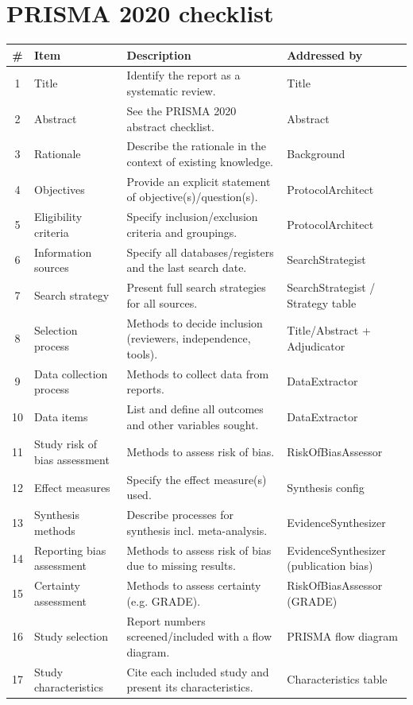 \documentclass[11pt]{article}
\begin{document}
\section{PRISMA 2020 checklist}
\begin{longtable}{c p{3.2cm} p{6.0cm} p{3.2cm}}
\toprule
\# & Item & Description & Addressed by \\
\midrule
\endhead
1 & Title & Identify the report as a systematic review. & Title \\
2 & Abstract & See the PRISMA 2020 abstract checklist. & Abstract \\
3 & Rationale & Describe the rationale in the context of existing knowledge. & Background \\
4 & Objectives & Provide an explicit statement of objective(s)/question(s). & ProtocolArchitect \\
5 & Eligibility criteria & Specify inclusion/exclusion criteria and groupings. & ProtocolArchitect \\
6 & Information sources & Specify all databases/registers and the last search date. & SearchStrategist \\
7 & Search strategy & Present full search strategies for all sources. & SearchStrategist / Strategy table \\
8 & Selection process & Methods to decide inclusion (reviewers, independence, tools). & Title/Abstract + Adjudicator \\
9 & Data collection process & Methods to collect data from reports. & DataExtractor \\
10 & Data items & List and define all outcomes and other variables sought. & DataExtractor \\
11 & Study risk of bias assessment & Methods to assess risk of bias. & RiskOfBiasAssessor \\
12 & Effect measures & Specify the effect measure(s) used. & Synthesis config \\
13 & Synthesis methods & Describe processes for synthesis incl. meta-analysis. & EvidenceSynthesizer \\
14 & Reporting bias assessment & Methods to assess risk of bias due to missing results. & EvidenceSynthesizer (publication bias) \\
15 & Certainty assessment & Methods to assess certainty (e.g. GRADE). & RiskOfBiasAssessor (GRADE) \\
16 & Study selection & Report numbers screened/included with a flow diagram. & PRISMA flow diagram \\
17 & Study characteristics & Cite each included study and present its characteristics. & Characteristics table \\

\end{longtable}
\end{document}
